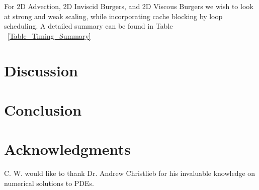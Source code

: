 \documentclass{article}
\begin{document}
For 2D Advection, 2D Inviscid Burgers, and 2D Viscous Burgers we wish to look at strong and weak scaling, while incorporating cache blocking by loop scheduling. A detailed summary can be found in Table ~\ref{Table_Timing_Summary}




\section{Discussion}
\section{Conclusion}
\section{Acknowledgments}

C. W. would like to thank Dr. Andrew Christlieb for his invaluable knowledge on numerical solutions to PDEs.







  

\end{document}
